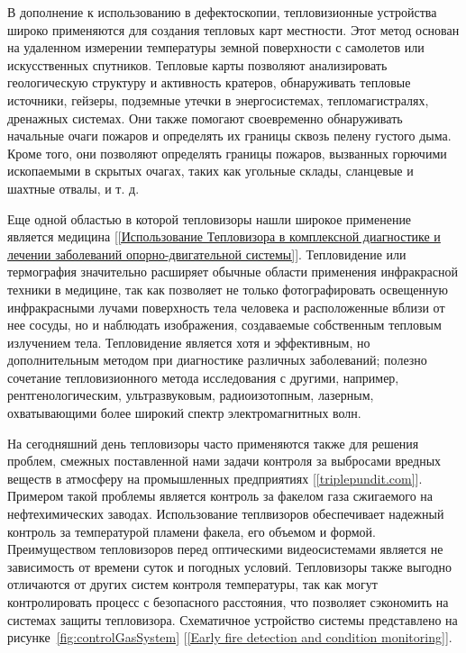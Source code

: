 \documentclass[14pt, a4paper]{extreport}
\begin{document}
	В дополнение к использованию в дефектоскопии, тепловизионные устройства широко применяются для создания тепловых карт местности. Этот метод основан на удаленном измерении температуры земной поверхности с самолетов или искусственных спутников. Тепловые карты позволяют анализировать геологическую структуру и активность кратеров, обнаруживать тепловые источники, гейзеры, подземные утечки в энергосистемах, тепломагистралях, дренажных системах. Они также помогают своевременно обнаруживать начальные очаги пожаров и определять их границы сквозь пелену густого дыма. Кроме того, они позволяют определять границы пожаров, вызванных горючими ископаемыми в скрытых очагах, таких как угольные склады, сланцевые и шахтные отвалы, и т. д.
	
	Еще одной областью в которой тепловизоры нашли широкое применение является медицина [\ref{Использование Тепловизора в комплексной диагностике и лечении заболеваний опорно-двигательной системы}]. Тепловидение или термография значительно расширяет обычные области применения инфракрасной техники в медицине, так как позволяет не только фотографировать освещенную инфракрасными лучами поверхность тела человека и расположенные вблизи от нее сосуды, но и наблюдать изображения, создаваемые собственным тепловым излучением тела. Тепловидение является хотя и эффективным, но дополнительным методом при диагностике различных заболеваний; полезно сочетание тепловизионного метода исследования с другими, например, рентгенологическим, ультразвуковым, радиоизотопным, лазерным, охватывающими более широкий спектр электромагнитных волн.
	
	На сегодняшний день тепловизоры часто применяются также для решения проблем, смежных поставленной нами задачи контроля за выбросами вредных веществ в атмосферу на промышленных предприятиях [\ref{triplepundit.com}]. Примером такой проблемы является контроль за факелом газа сжигаемого на нефтехимических заводах. Использование теплвизоров обеспечивает надежный контроль за температурой пламени факела, его объемом и формой. Преимуществом тепловизоров перед оптическими видеосистемами является не зависимость от времени суток и погодных условий. Тепловизоры также выгодно отличаются от других систем контроля температуры, так как могут контролировать процесс с безопасного расстояния, что позволяет сэкономить на системах защиты тепловизора. Схематичное устройство системы представлено на рисунке~\ref{fig:controlGasSystem} [\ref{Early fire detection and condition monitoring}].
	
\end{document}
